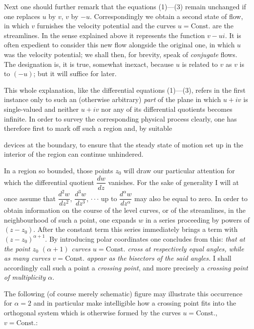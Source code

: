 \documentclass{article}
\begin{document}
Next one should further remark that the equations (1)---(3) remain unchanged if one replaces $u$ by $v$, $v$ by $-u$. Correspondingly we obtain a second state of flow, in which $v$ furnishes the velocity potential and the curves $u = \text{Const.}$ are the streamlines. In the sense explained above it represents the function $v - ui$. It is often expedient to consider this new flow alongside the original one, in which $u$ was the velocity potential; we shall then, for brevity, speak of \emph{conjugate} flows. The designation is, it is true, somewhat inexact, because $u$ is related to $v$ as $v$ is to $(-u)$; but it will suffice for later.

This whole explanation, like the differential equations (1)---(3), refers in the first instance only to such an (otherwise arbitrary) \emph{part} of the plane in which $u + iv$ is single-valued and neither $u + iv$ nor any of its differential quotients becomes infinite. In order to survey the corresponding physical process clearly, one has therefore first to mark off such a region and, by suitable

devices at the boundary, to ensure that the steady state of motion set up in the interior of the region can continue unhindered.

In a region so bounded, those points $z_{0}$ will draw our particular attention for which the differential quotient $\dfrac{dw}{dz}$ vanishes. For the sake of generality I will at once assume that $\dfrac{d^{2}w}{dz^{2}}$, $\dfrac{d^{3}w}{dz^{3}}$, $\cdot\cdot\cdot$ up to $\dfrac{d^{\alpha}w}{dz^{\alpha}}$ may also be equal to zero. In order to obtain information on the course of the level curves, or of the streamlines, in the neighbourhood of such a point, one expands $w$ in a series proceeding by powers of $(z - z_{0})$. After the constant term this series immediately brings a term with $(z - z_{0})^{\alpha + 1}$. By introducing polar coordinates one concludes from this: \emph{that at the point $z_{0}$ $(\alpha + 1)$ curves $u = \text{Const.}$ cross at respectively equal angles, while as many curves $v = \text{Const.}$ appear as the bisectors of the said angles.} I shall accordingly call such a point a \emph{crossing point}, and more precisely a \emph{crossing point of multiplicity $\alpha$}.

The following (of course merely schematic) figure may illustrate this occurrence for $\alpha = 2$ and in particular make intelligible how a crossing point fits into the orthogonal system which is otherwise formed by the curves $u = \text{Const.}$, $v = \text{Const.}$:
\end{document}
